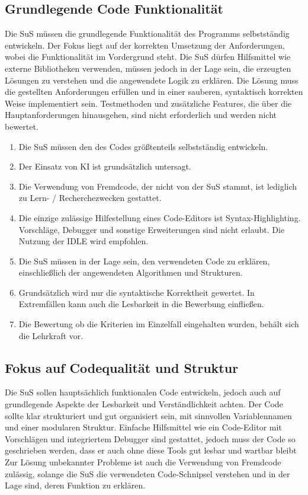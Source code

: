 \documentclass[a4paper,12pt]{article}
\begin{document}
\subsection{Grundlegende Code Funktionalität}
Die SuS müssen die grundlegende Funktionalität des Programms selbstständig entwickeln. Der Fokus liegt auf der korrekten Umsetzung der Anforderungen, wobei die Funktionalität im Vordergrund steht. Die SuS dürfen Hilfsmittel wie externe Bibliotheken verwenden, müssen jedoch in der Lage sein, die erzeugten Lösungen zu verstehen und die angewendete Logik zu erklären. Die Lösung muss die gestellten Anforderungen erfüllen und in einer sauberen, syntaktisch korrekten Weise implementiert sein. Testmethoden und zusätzliche Features, die über die Hauptanforderungen hinausgehen, sind nicht erforderlich und werden nicht bewertet.

\begin{enumerate}[label=\S\ \arabic*]
    \item Die SuS müssen den des Codes größtenteils selbstständig entwickeln.
    \item Der Einsatz von KI ist grundsätzlich untersagt.
    \item Die Verwendung von Fremdcode, der nicht von der SuS stammt, ist lediglich zu Lern- / Recherchezwecken gestattet.
    \item Die einzige zulässige Hilfestellung eines Code-Editors ist Syntax-Highlighting. Vorschläge, Debugger und sonstige Erweiterungen sind nicht erlaubt. Die Nutzung der IDLE wird empfohlen.
    \item Die SuS müssen in der Lage sein, den verwendeten Code zu erklären, einschließlich der angewendeten Algorithmen und Strukturen.
    \item Grundsätzlich wird nur die syntaktische Korrektheit gewertet. In Extremfällen kann auch die Lesbarkeit in die Bewerbung einfließen.
    \item Die Bewertung ob die Kriterien im Einzelfall eingehalten wurden, behält sich die Lehrkraft vor.
\end{enumerate}


\subsection{Fokus auf Codequalität und Struktur}
Die SuS sollen hauptsächlich funktionalen Code entwickeln, jedoch auch auf grundlegende Aspekte der Lesbarkeit und Verständlichkeit achten. Der Code sollte klar strukturiert und gut organisiert sein, mit sinnvollen Variablennamen und einer modularen Struktur. Einfache Hilfsmittel wie ein Code-Editor mit Vorschlägen und integriertem Debugger sind gestattet, jedoch muss der Code so geschrieben werden, dass er auch ohne diese Tools gut lesbar und wartbar bleibt Zur Lösung unbekannter Probleme ist auch die Verwendung von Fremdcode zulässig, solange die SuS die verwendeten Code-Schnipsel verstehen und in der Lage sind, deren Funktion zu erklären.
\end{document}
